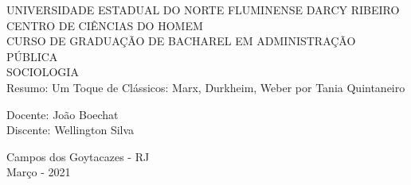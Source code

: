 \begin{center}
    {\large UNIVERSIDADE ESTADUAL DO NORTE FLUMINENSE DARCY RIBEIRO}
    \\[0.2cm]
    {\large CENTRO DE CIÊNCIAS DO HOMEM}
    \\[0.2cm]
    {\large CURSO DE GRADUAÇÃO DE BACHAREL EM ADMINISTRAÇÃO PÚBLICA}
    \\[0.2cm]
    {\large SOCIOLOGIA}
    \\[8cm]
    { \huge Resumo: Um Toque de Clássicos: Marx, Durkheim, Weber por Tania Quintaneiro}
    \\[4cm]
\end{center}

\begin{flushleft}
    Docente: João Boechat\\[.2cm]
    Discente: Wellington Silva\\[4cm]
\end{flushleft}

\begin{center}
    {\large Campos dos Goytacazes - RJ}\\[0.2cm]
    {\large Março - 2021}
\end{center}